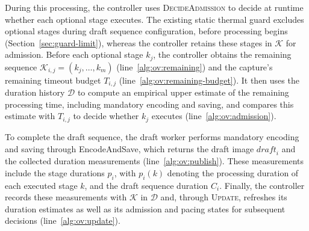 During this processing, the controller uses \textsc{DecideAdmission} to decide at runtime whether each optional stage executes.
The existing static thermal guard excludes optional stages during draft sequence configuration, before processing begins (Section~\ref{sec:guard-limit}), whereas the controller retains these stages in \(\mathcal K\) for admission.
Before each optional stage \(k_j\), the controller obtains the remaining sequence \(\mathcal K_{i,j}=(k_j,\ldots,k_m)\) (line~\ref{alg:ov:remaining}) and the capture's remaining timeout budget \(T_{i,j}\) (line~\ref{alg:ov:remaining-budget}).
It then uses the duration history \(\mathcal D\) to compute an empirical upper estimate of the remaining processing time, including mandatory encoding and saving, and compares this estimate with \(T_{i,j}\) to decide whether \(k_j\) executes (line~\ref{alg:ov:admission}).

To complete the draft sequence, the draft worker performs mandatory encoding and saving through \textsf{EncodeAndSave}, which returns the draft image \(\mathit{draft}_i\) and the collected duration measurements (line~\ref{alg:ov:publish}).
These measurements include the stage durations \(p_i\), with \(p_i(k)\) denoting the processing duration of each executed stage \(k\), and the draft sequence duration \(C_i\).
Finally, the controller records these measurements with \(\mathcal K\) in \(\mathcal D\) and, through \textsc{Update}, refreshes its duration estimates as well as its admission and pacing states for subsequent decisions (line~\ref{alg:ov:update}).

